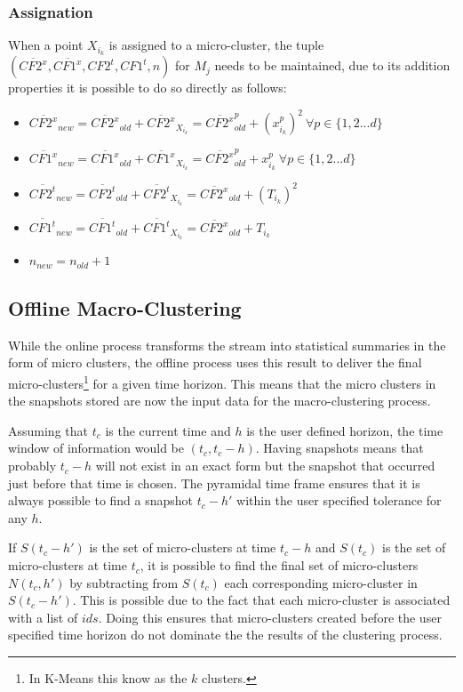\documentclass{llncs}
\begin{document}
\subsubsection{Assignation}

When a point $X_{i_k}$ is assigned to a micro-cluster, the tuple $(\overline{CF2^x},\overline{CF1^x},CF2^t,CF1^t,n)$ for $M_j$ needs to be maintained, due to its addition properties it is possible to do so directly as follows:

\begin{itemize}
 \item $\overline{CF2^x}_{new} = \overline{CF2^x}_{old} + \overline{CF2^x}_{X_{i_k}} = \overline{CF2^x}_{old}^p + (x^p_{i_k})^2\ \forall p \in \{1,2...d\}$
 \item $\overline{CF1^x}_{new} = \overline{CF1^x}_{old} + \overline{CF1^x}_{X_{i_k}} = \overline{CF2^x}_{old}^p + x^p_{i_k} \ \forall p \in \{1,2...d\}$
 \item $\overline{CF2^t}_{new} = \overline{CF2^t}_{old} + \overline{CF2^t}_{X_{i_k}} = \overline{CF2^x}_{old} + (T_{i_k})^2$
 \item $\overline{CF1^t}_{new} = \overline{CF1^t}_{old} + \overline{CF1^t}_{X_{i_k}} = \overline{CF2^x}_{old} + T_{i_k}$
 \item $n_{new} = n_{old} + 1$
\end{itemize}


\subsection{Offline Macro-Clustering} \label{cluOffline}

While the online process transforms the stream into statistical summaries in the form of micro clusters, the offline process uses this result to deliver the final micro-clusters\footnote{In K-Means this know as the $k$ clusters.} for a given time horizon. This means that the micro clusters in the snapshots stored are now the input data for the macro-clustering process.

Assuming that $t_c$ is the current time and $h$ is the user defined horizon, the time window of information would be $(t_c, t_c - h)$. Having snapshots means that probably $t_c - h$ will not exist in an exact form but the snapshot that occurred just before that time is chosen. The pyramidal time frame ensures that it is always possible to find a snapshot $t_c - h'$ within the user specified tolerance for any $h$.

If $S(t_c - h')$ is the set of micro-clusters at time $t_c - h$ and $S(t_c)$ is the set of micro-clusters at time $t_c$, it is possible to find the final set of micro-clusters $N(t_c,h')$ by subtracting from $S(t_c)$ each corresponding micro-cluster in $S(t_c - h')$. This is possible due to the fact that each micro-cluster is associated with a list of $ids$. Doing this ensures that micro-clusters created before the user specified time horizon do not dominate the the results of the clustering process. 
\end{document}
